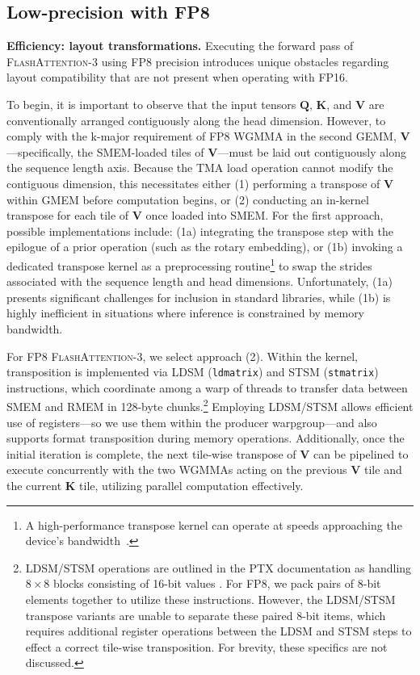 \subsection{Low-precision with FP8}
\label{sec:algofp8}

\textbf{Efficiency: layout transformations.} Executing the forward pass of \textsc{FlashAttention-3} using FP8 precision introduces unique obstacles regarding layout compatibility that are not present when operating with FP16.

To begin, it is important to observe that the input tensors $\mathbf{Q}$, $\mathbf{K}$, and $\mathbf{V}$ are conventionally arranged contiguously along the head dimension. However, to comply with the k-major requirement of FP8 WGMMA in the second GEMM, $\mathbf{V}$—specifically, the SMEM-loaded tiles of $\mathbf{V}$—must be laid out contiguously along the sequence length axis. Because the TMA load operation cannot modify the contiguous dimension, this necessitates either (1) performing a transpose of $\mathbf{V}$ within GMEM before computation begins, or (2) conducting an in-kernel transpose for each tile of $\mathbf{V}$ once loaded into SMEM. For the first approach, possible implementations include: (1a) integrating the transpose step with the epilogue of a prior operation (such as the rotary embedding), or (1b) invoking a dedicated transpose kernel as a preprocessing routine\footnote{A high-performance transpose kernel can operate at speeds approaching the device's bandwidth~\citep{colfax_cutlass_transpose_2024}.} to swap the strides associated with the sequence length and head dimensions. Unfortunately, (1a) presents significant challenges for inclusion in standard libraries, while (1b) is highly inefficient in situations where inference is constrained by memory bandwidth.

For FP8 \textsc{FlashAttention-3}, we select approach (2). Within the kernel, transposition is implemented via LDSM (\verb|ldmatrix|) and STSM (\verb|stmatrix|) instructions, which coordinate among a warp of threads to transfer data between SMEM and RMEM in 128-byte chunks.\footnote{LDSM/STSM operations are outlined in the PTX documentation as handling $8 \times 8$ blocks consisting of 16-bit values \cite[\S 9.7.13.4.15-16]{ptx}. For FP8, we pack pairs of 8-bit elements together to utilize these instructions. However, the LDSM/STSM transpose variants are unable to separate these paired 8-bit items, which requires additional register operations between the LDSM and STSM steps to effect a correct tile-wise transposition. For brevity, these specifics are not discussed.} Employing LDSM/STSM allows efficient use of registers—so we use them within the producer warpgroup—and also supports format transposition during memory operations. Additionally, once the initial iteration is complete, the next tile-wise transpose of $\mathbf{V}$ can be pipelined to execute concurrently with the two WGMMAs acting on the previous $\mathbf{V}$ tile and the current $\mathbf{K}$ tile, utilizing parallel computation effectively.

